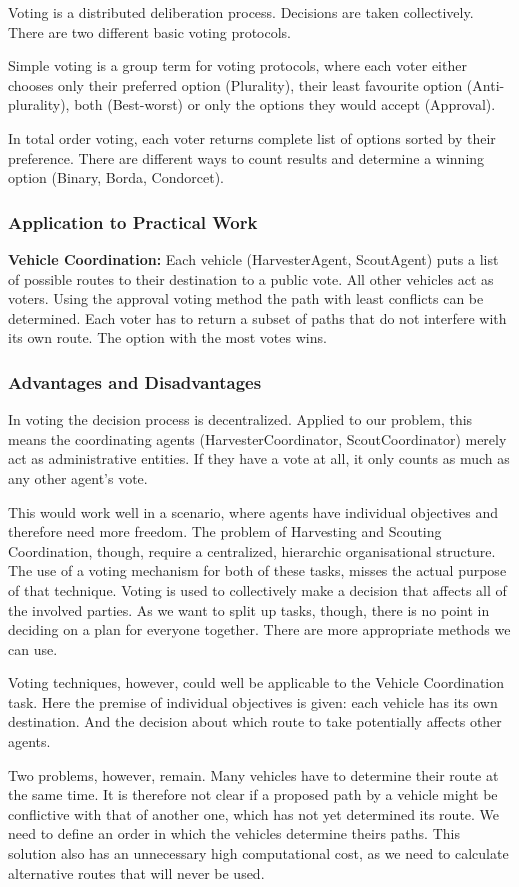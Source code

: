 Voting is a distributed deliberation process. Decisions are taken collectively. There are two different basic voting protocols. 

Simple voting is a group term for voting protocols, where each voter either chooses only their preferred option (Plurality), their least favourite option (Anti-plurality), both (Best-worst) or only the options they would accept (Approval).

In total order voting, each voter returns complete list of options sorted by their preference. There are different ways to count results and determine a winning option (Binary, Borda, Condorcet).

\subsubsection{Application to Practical Work}

\textbf{Vehicle Coordination:} Each vehicle (HarvesterAgent, ScoutAgent) puts a list of possible routes to their destination to a public vote. All other vehicles act as voters. Using the approval voting method the path with least conflicts can be determined. Each voter has to return a subset of paths that do not interfere with its own route. The option with the most votes wins.

\subsubsection{Advantages and Disadvantages}

In voting the decision process is decentralized. Applied to our problem, this means the coordinating agents (HarvesterCoordinator, ScoutCoordinator) merely act as administrative entities. If they have a vote at all, it only counts as much as any other agent’s vote. 

This would work well in a scenario, where agents have individual objectives and therefore need more freedom. The problem of Harvesting and Scouting Coordination, though, require a centralized, hierarchic organisational structure. The use of a voting mechanism for both of these tasks, misses the actual purpose of that technique. Voting is used to collectively make a decision that affects all of the involved parties. As we want to split up tasks, though, there is no point in deciding on a plan for everyone together. There are more appropriate methods we can use.

Voting techniques, however, could well be applicable to the Vehicle Coordination task. Here the premise of individual objectives is given: each vehicle has its own destination. And the decision about which route to take potentially affects other agents. 

Two problems, however, remain. Many vehicles have to determine their route at the same time. It is therefore not clear if a proposed path by a vehicle might be conflictive with that of another one, which has not yet determined its route. We need to define an order in which the vehicles determine theirs paths. This solution also has an unnecessary high computational cost, as we need to calculate alternative routes that will never be used.



